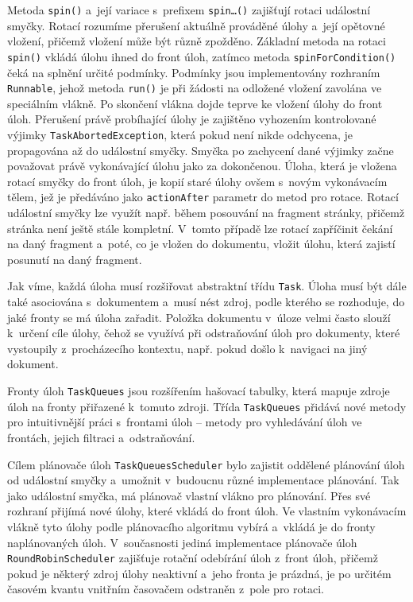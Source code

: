 Metoda \texttt{spin()} a~její variace s~prefixem \texttt{spin\ldots()} zajišťují rotaci událostní smyčky. Rotací rozumíme přerušení aktuálně prováděné úlohy a~její opětovné vložení, přičemž vložení může být různě zpožděno. Základní metoda na rotaci \texttt{spin()} vkládá úlohu ihned do front úloh, zatímco metoda \texttt{spinForCondition()} čeká na splnění určité podmínky. Podmínky jsou implementovány rozhraním \texttt{Runnable}, jehož metoda \texttt{run()} je při žádosti na odložené vložení zavolána ve speciálním vlákně. Po skončení vlákna dojde teprve ke vložení úlohy do front úloh. Přerušení právě probíhající úlohy je zajištěno vyhozením kontrolované výjimky \texttt{TaskAbortedException}, která pokud není nikde odchycena, je propagována až do událostní smyčky. Smyčka po zachycení dané výjimky začne považovat právě vykonávající úlohu jako za dokončenou. Úloha, která je vložena rotací smyčky do front úloh, je kopií staré úlohy ovšem s~novým vykonávacím tělem, jež je předáváno jako \texttt{actionAfter} parametr do metod pro rotace. Rotací událostní smyčky lze využít např. během posouvání na fragment stránky, přičemž stránka není ještě stále kompletní. V~tomto případě lze rotací zapříčinit čekání na daný fragment a~poté, co je vložen do dokumentu, vložit úlohu, která zajistí posunutí na daný fragment.

Jak víme, každá úloha musí rozšiřovat abstraktní třídu \texttt{Task}. Úloha musí být dále také asociována s~dokumentem a~musí nést zdroj, podle kterého se rozhoduje, do jaké fronty se má úloha zařadit. Položka dokumentu v~úloze velmi často slouží k~určení cíle úlohy, čehož se využívá při odstraňování úloh pro dokumenty, které vystoupily z~procházecího kontextu, např. pokud došlo k~navigaci na jiný dokument. 

Fronty úloh \texttt{TaskQueues} jsou rozšířením hašovací tabulky, která mapuje zdroje úloh na fronty přiřazené k~tomuto zdroji. Třída \texttt{TaskQueues} přidává nové metody pro intuitivnější práci s~frontami úloh -- metody pro vyhledávání úloh ve frontách, jejich filtraci a~odstraňování.

Cílem plánovače úloh \texttt{TaskQueuesScheduler} bylo zajistit oddělené plánování úloh od událostní smyčky a~umožnit v~budoucnu různé implementace plánování. Tak jako událostní smyčka, má plánovač vlastní vlákno pro plánování. Přes své rozhraní přijímá nové úlohy, které vkládá do front úloh. Ve vlastním vykonávacím vlákně tyto úlohy podle plánovacího algoritmu vybírá a~vkládá je do fronty naplánovaných úloh. V~současnosti jediná implementace plánovače úloh \texttt{RoundRobinScheduler} zajišťuje rotační odebírání úloh z~front úloh, přičemž pokud je některý zdroj úlohy neaktivní a~jeho fronta je prázdná, je po určitém časovém kvantu vnitřním časovačem odstraněn z~pole pro rotaci.

